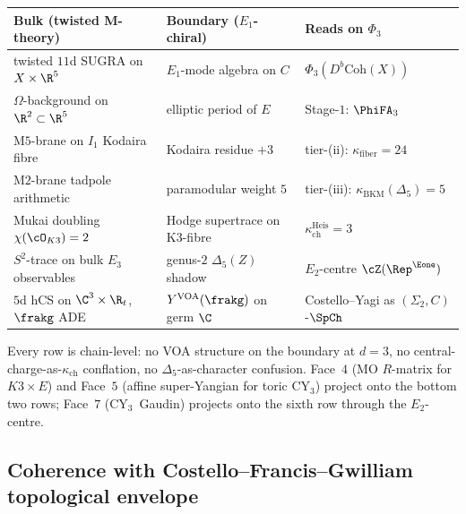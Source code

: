 \begin{center}
\small
\renewcommand{\arraystretch}{1.25}
\begin{tabular}{lll}
\toprule
Bulk (twisted M-theory) & Boundary ($E_1$-chiral) & Reads on $\Phi_3$ \\
\midrule
twisted $11$d SUGRA on $X \times \R^5$ & $E_1$-mode algebra on $C$ & $\Phi_3(D^b\mathrm{Coh}(X))$ \\
$\Omega$-background on $\R^2 \subset \R^5$ & elliptic period of $E$ & Stage-$1$: $\PhiFA_3$ \\
M$5$-brane on $I_1$ Kodaira fibre & Kodaira residue $+3$ & tier-\textup{(ii)}: $\kappa_{\mathrm{fiber}} = 24$ \\
M$2$-brane tadpole arithmetic & paramodular weight $5$ & tier-\textup{(iii)}: $\kappa_{\mathrm{BKM}}(\Delta_5) = 5$ \\
Mukai doubling $\chi(\cO_{K3}) = 2$ & Hodge supertrace on K3-fibre & $\kappa_{\mathrm{ch}}^{\mathrm{Heis}} = 3$ \\
$S^2$-trace on bulk $E_3$ observables & genus-$2$ $\Delta_5(Z)$ shadow & $E_2$-centre $\cZ(\Rep^{\Eone})$ \\
$5$d hCS on $\C^3 \times \R_t$, $\frakg$ ADE & $Y^{\mathrm{VOA}}(\frakg)$ on germ $\C$ & Costello--Yagi as $(\Sigma_2, C)$-$\SpCh$ \\
\bottomrule
\end{tabular}
\end{center}

Every row is chain-level: no VOA structure on the boundary at $d = 3$,
no central-charge-as-$\kappa_{\mathrm{ch}}$ conflation, no
$\Delta_5$-as-character confusion. Face~$4$ (MO $R$-matrix for
$K3 \times E$) and Face~$5$ (affine super-Yangian for toric CY$_3$)
project onto the bottom two rows; Face~$7$ (CY$_3$~Gaudin) projects
onto the sixth row through the $E_2$-centre.

\subsection{Coherence with Costello--Francis--Gwilliam topological envelope}
\label{subsec:CFG-coherence-envelope}

